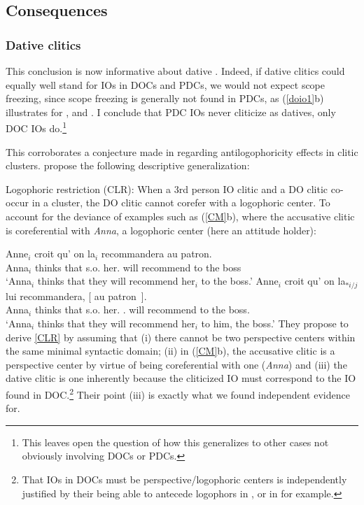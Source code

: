 \documentclass[output=paper]{langsci/langscibook}
\begin{document}
\subsection{Consequences}

\subsubsection{Dative clitics}

This conclusion is now informative about dative .
Indeed, if dative clitics could equally well stand for
\glspl{IO} in \glspl{DOC} and \glspl{PDC}, we
would not expect scope freezing, since scope freezing is generally not found in
\glspl{PDC}, as (\ref{doio1}b) illustrates for , and .
I conclude that \gls{PDC} \glspl{IO}
never cliticize as datives, only \gls{DOC} \glspl{IO} do.\footnote{This leaves
open the question of how this generalizes to other cases not obviously
involving \glspl{DOC} or \glspl{PDC}.}

This corroborates a conjecture made in \citet{Charnavel2015} regarding
antilogophoricity effects in clitic clusters. \citet{Charnavel2015} propose the
following descriptive generalization:

\ea \label{CLR} Logophoric restriction (CLR): When a 3rd person IO clitic and a DO clitic co-occur in a cluster, the DO clitic cannot corefer
with a logophoric center.
\z
%
To account for the deviance of examples such as (\ref{CM}b), where the
accusative clitic is coreferential with {\it Anna}, a logophoric center (here
an attitude holder):

\ea \label{CM} \ea
	\gll Anne$_i$ croit qu' on  la$_i$ recommandera au patron.\\
        Anna$_i$ thinks that s.o. her.\Acc{} {will recommend} {to the} boss \\
    \trans `Anna$_i$ thinks that they will recommend her$_i$ to the boss.'
    \ex
	\gll  Anne$_i$ croit qu' on la$_{*i/j}$ lui recommandera, [ au patron~].\\
    Anna$_i$ thinks that s.o. her.\Acc{} \Third.\Dat{} {will recommend} {} {to the} boss.\\
    \trans `Anna$_i$ thinks that they will recommend her$_i$ to him, the boss.'
\z
\z
%
They propose to derive \eqref{CLR} by assuming that (i) there cannot be two
perspective centers within the same minimal syntactic domain; (ii) in
(\ref{CM}b), the accusative clitic is a perspective center by virtue of being
coreferential with one ({\it Anna}) and (iii) the dative clitic is one
inherently because the cliticized IO must correspond to the IO found in
DOC.\footnote{That \glspl{IO} in \glspl{DOC} must be perspective/logophoric
    centers is independently justified by their being able to antecede
    logophors in , or in  for example.} Their point (iii) is
    exactly what we found independent evidence for.
\end{document}
